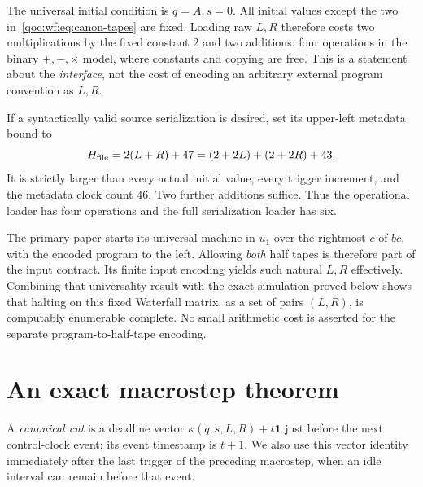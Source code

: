 \documentclass[11pt,letterpaper]{article}
\theoremstyle{definition}
\theoremstyle{remark}
\newcommand{\one}{\mathbf 1}
\newcommand{\cani}{\kappa}
\begin{document}
The universal initial condition is $q=A,s=0$. All initial values except the two in~\eqref{qoc:wf:eq:canon-tapes} are fixed. Loading raw $L,R$ therefore costs two multiplications by the fixed constant $2$ and two additions: four operations in the binary $+,-,\times$ model, where constants and copying are free. This is a statement about the \emph{interface}, not the cost of encoding an arbitrary external program convention as $L,R$.

If a syntactically valid source serialization is desired, set its upper-left metadata bound to
\[
 H_{\rm file}=2(L+R)+47=(2+2L)+(2+2R)+43.
\]
It is strictly larger than every actual initial value, every trigger increment, and the metadata clock count $46$. Two further additions suffice. Thus the operational loader has four operations and the full serialization loader has six.

The primary paper starts its universal machine in $u_1$ over the rightmost $c$ of $bc$, with the encoded program to the left. Allowing \emph{both} half tapes is therefore part of the input contract. Its finite input encoding yields such natural $L,R$ effectively. Combining that universality result with the exact simulation proved below shows that halting on this fixed Waterfall matrix, as a set of pairs $(L,R)$, is computably enumerable complete. No small arithmetic cost is asserted for the separate program-to-half-tape encoding.

\section{An exact macrostep theorem}\label{qoc:wf:sec:macro}
A \emph{canonical cut} is a deadline vector $\cani(q,s,L,R)+t\one$ just before the next control-clock event; its event timestamp is $t+1$. We also use this vector identity immediately after the last trigger of the preceding macrostep, when an idle interval can remain before that event.
\end{document}
